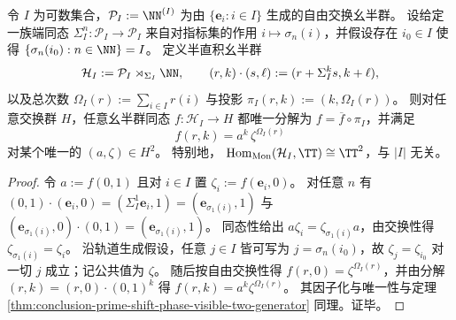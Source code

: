 \begin{theorem}[轨道生成对称下的有限相位原则]\label{thm:conclusion-orbit-generator-finite-phase-principle}
令 \(I\) 为可数集合，\(\mathcal P_I:=\NN^{(I)}\) 为由 \(\{\mathbf e_i:i\in I\}\) 生成的自由交换幺半群。
设给定一族端同态 \(\Sigma_I^n:\mathcal P_I\to\mathcal P_I\) 来自对指标集的作用 \(i\mapsto \sigma_n(i)\)，并假设存在 \(i_0\in I\) 使得 \(\{\sigma_n(i_0):n\in\NN\}=I\)。
定义半直积幺半群
\[
\mathcal H_I:=\mathcal P_I\rtimes_{\Sigma_I}\NN,
\qquad
(r,k)\cdot(s,\ell):=(r+\Sigma_I^k s,k+\ell),
\]
以及总次数 \(\Omega_I(r):=\sum_{i\in I}r(i)\) 与投影 \(\pi_I(r,k):=(k,\Omega_I(r))\)。
则对任意交换群 \(H\)，任意幺半群同态 \(f:\mathcal H_I\to H\) 都唯一分解为 \(f=\overline f\circ \pi_I\)，并满足
\[
f(r,k)=a^k\,\zeta^{\Omega_I(r)}
\]
对某个唯一的 \((a,\zeta)\in H^2\)。
特别地，
\(
\mathrm{Hom}_{\mathrm{Mon}}(\mathcal H_I,\TT)\cong \TT^2
\)，与 \(|I|\) 无关。
\end{theorem}
\begin{proof}
令 \(a:=f(0,1)\) 且对 \(i\in I\) 置 \(\zeta_i:=f(\mathbf e_i,0)\)。
对任意 \(n\) 有
\(
(0,1)\cdot(\mathbf e_i,0)=(\Sigma_I^1\mathbf e_i,1)=(\mathbf e_{\sigma_1(i)},1)
\)
与
\(
(\mathbf e_{\sigma_1(i)},0)\cdot(0,1)=(\mathbf e_{\sigma_1(i)},1)
\)。
同态性给出
\(
a\zeta_i=\zeta_{\sigma_1(i)}a
\)，由交换性得 \(\zeta_{\sigma_1(i)}=\zeta_i\)。
沿轨道生成假设，任意 \(j\in I\) 皆可写为 \(j=\sigma_n(i_0)\)，故 \(\zeta_j=\zeta_{i_0}\) 对一切 \(j\) 成立；记公共值为 \(\zeta\)。
随后按自由交换性得 \(f(r,0)=\zeta^{\Omega_I(r)}\)，并由分解 \((r,k)=(r,0)\cdot(0,1)^k\) 得 \(f(r,k)=a^k\zeta^{\Omega_I(r)}\)。
其因子化与唯一性与定理 \ref{thm:conclusion-prime-shift-phase-visible-two-generator} 同理。证毕。
\end{proof}

\endinput
